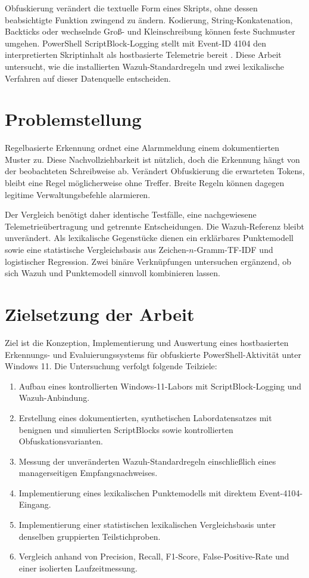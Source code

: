 \documentclass[12pt,a4paper,oneside,parskip=half]{scrreprt}
\begin{document}
Obfuskierung verändert die textuelle Form eines Skripts, ohne dessen beabsichtigte Funktion zwingend zu ändern. Kodierung, String-Konkatenation, Backticks oder wechselnde Groß- und Kleinschreibung können feste Suchmuster umgehen. PowerShell ScriptBlock-Logging stellt mit Event-ID 4104 den interpretierten Skriptinhalt als hostbasierte Telemetrie bereit \cite{microsoft-logging-windows,microsoft-logging}. Diese Arbeit untersucht, wie die installierten Wazuh-Standardregeln und zwei lexikalische Verfahren auf dieser Datenquelle entscheiden.

\section{Problemstellung}
Regelbasierte Erkennung ordnet eine Alarmmeldung einem dokumentierten Muster zu. Diese Nachvollziehbarkeit ist nützlich, doch die Erkennung hängt von der beobachteten Schreibweise ab. Verändert Obfuskierung die erwarteten Tokens, bleibt eine Regel möglicherweise ohne Treffer. Breite Regeln können dagegen legitime Verwaltungsbefehle alarmieren.

Der Vergleich benötigt daher identische Testfälle, eine nachgewiesene Telemetrieübertragung und getrennte Entscheidungen. Die Wazuh-Referenz bleibt unverändert. Als lexikalische Gegenstücke dienen ein erklärbares Punktemodell sowie eine statistische Vergleichsbasis aus Zeichen-\(n\)-Gramm-TF-IDF und logistischer Regression. Zwei binäre Verknüpfungen untersuchen ergänzend, ob sich Wazuh und Punktemodell sinnvoll kombinieren lassen.

\section{Zielsetzung der Arbeit}
Ziel ist die Konzeption, Implementierung und Auswertung eines hostbasierten Erkennungs- und Evaluierungssystems für obfuskierte PowerShell-Aktivität unter Windows 11. Die Untersuchung verfolgt folgende Teilziele:
\begin{enumerate}[label=Z\arabic*]
    \item Aufbau eines kontrollierten Windows-11-Labors mit ScriptBlock-Logging und Wazuh-Anbindung.
    \item Erstellung eines dokumentierten, synthetischen Labordatensatzes mit benignen und simulierten ScriptBlocks sowie kontrollierten Obfuskationsvarianten.
    \item Messung der unveränderten Wazuh-Standardregeln einschließlich eines managerseitigen Empfangsnachweises.
    \item Implementierung eines lexikalischen Punktemodells mit direktem Event-4104-Eingang.
    \item Implementierung einer statistischen lexikalischen Vergleichsbasis unter denselben gruppierten Teilstichproben.
    \item Vergleich anhand von Precision, Recall, F1-Score, False-Positive-Rate und einer isolierten Laufzeitmessung.
\end{enumerate}
\end{document}
